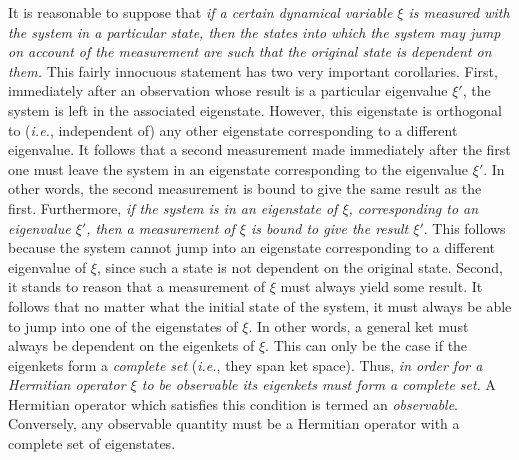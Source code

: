 It is reasonable to suppose that {\em if a certain dynamical variable
$\xi$ is measured with the system in a particular state, then the states
into which the system may jump on account of the measurement are such
that the original state is dependent on them.} This fairly innocuous
statement has two very important corollaries. First, immediately after an
observation whose result is a particular eigenvalue $\xi'$,  the system
is left in the associated eigenstate. However, this eigenstate is 
orthogonal to ({\em i.e.}, independent of) any other eigenstate corresponding
to a different eigenvalue. It follows that a second measurement made
immediately after the first one must leave the system in an eigenstate
corresponding to the eigenvalue $\xi'$. In other words, the second measurement is
bound to give the same result as the first. Furthermore, {\em if the system is
in an eigenstate of $\xi$, corresponding to an eigenvalue $\xi'$, then
a measurement of $\xi$ is bound to give the result $\xi'$}. This follows
because the system cannot jump into an eigenstate corresponding to a
different eigenvalue of $\xi$, since such a state is not dependent on
the original state. Second, it stands to reason that a measurement
of $\xi$ must always yield some result. It follows that no matter what
the initial state of the system, it must always be able to jump into one
of the eigenstates of $\xi$. In other words, a general ket must  always
be dependent on the eigenkets of $\xi$. This can  only be the case if the eigenkets
form a {\em complete set} ({\em i.e.}, they span ket space). Thus, {\em in order for
a Hermitian operator $\xi$ to be observable its eigenkets must form a complete set}.
A Hermitian  operator which satisfies this condition is termed an {\em observable}. 
Conversely, any observable quantity must be a Hermitian operator with a
complete set of eigenstates.

